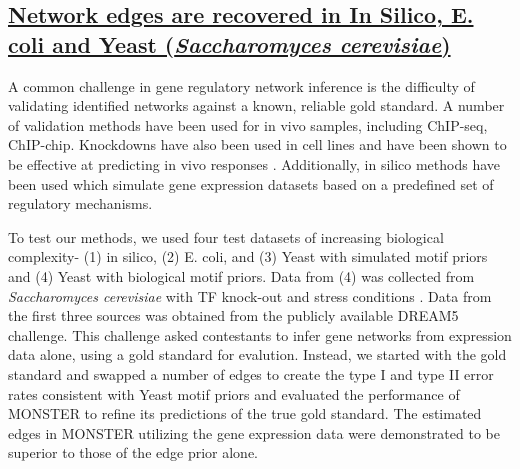 \documentclass[english]{article}
\begin{document}
\subsection*{\uline{Network edges are recovered in In Silico, E. coli and Yeast
(}\emph{\uline{Saccharomyces cerevisiae}}\uline{)}}

A common challenge in gene regulatory network inference is the difficulty
of validating identified networks against a known, reliable gold standard.
A number of validation methods have been used for in vivo samples,
including ChIP-seq, ChIP-chip. Knockdowns have also been used in cell
lines and have been shown to be effective at predicting in vivo responses
\cite{olsen2014inference}. Additionally, in silico methods have been
used which simulate gene expression datasets based on a predefined
set of regulatory mechanisms.

To test our methods, we used four test datasets of increasing biological
complexity- (1) in silico, (2) E. coli, and (3) Yeast with simulated
motif priors and (4) Yeast with biological motif priors. Data from
(4) was collected from \emph{Saccharomyces cerevisiae} with TF knock-out
and stress conditions \cite{harbison2004transcriptional}. Data from
the first three sources was obtained from the publicly available DREAM5
challenge\cite{marbach2012wisdom}. This challenge asked contestants
to infer gene networks from expression data alone, using a gold standard
for evalution. Instead, we started with the gold standard and swapped
a number of edges to create the type I and type II error rates consistent
with Yeast motif priors and evaluated the performance of MONSTER to
refine its predictions of the true gold standard. The estimated edges
in MONSTER utilizing the gene expression data were demonstrated to
be superior to those of the edge prior alone.
\end{document}
